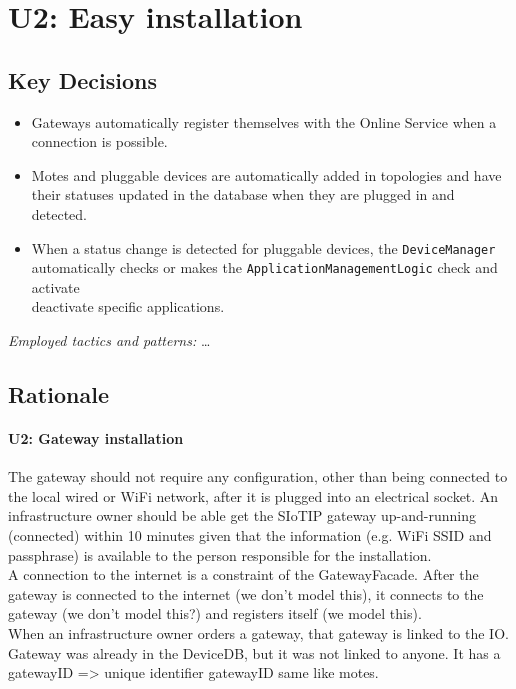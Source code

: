 \section{U2: Easy installation}

    \subsection*{Key Decisions}

        \begin{itemize}
        	\item Gateways automatically register themselves with the Online Service when a connection is possible.
        	\item Motes and pluggable devices are automatically added in topologies and have their statuses updated
                  in the database when they are plugged in and detected.
            \item When a status change is detected for pluggable devices, the \texttt{DeviceManager} automatically
                  checks or makes the \texttt{ApplicationManagementLogic} check and activate\\deactivate
                  specific applications.
        \end{itemize}
        \emph{Employed tactics and patterns:} \ldots

    \subsection*{Rationale}
        \paragraph{U2: Gateway installation}
            The gateway should not require any configuration, other than being connected
            to the local wired or WiFi network, after it is plugged into an electrical
            socket. An infrastructure owner should be able get the SIoTIP gateway
            up-and-running (connected) within 10 minutes given that the information
            (e.g. WiFi SSID and passphrase) is available to the person responsible for
            the installation. \\

            A connection to the internet is a constraint of the GatewayFacade.
            After the gateway is connected to the internet (we don't model this),
            it connects to the gateway (we don't model this?) and registers itself (we model this). \\
            When an infrastructure owner orders a gateway, that gateway is linked to the IO.
            Gateway was already in the DeviceDB, but it was not linked to anyone. It has a gatewayID => unique identifier gatewayID same like motes.

